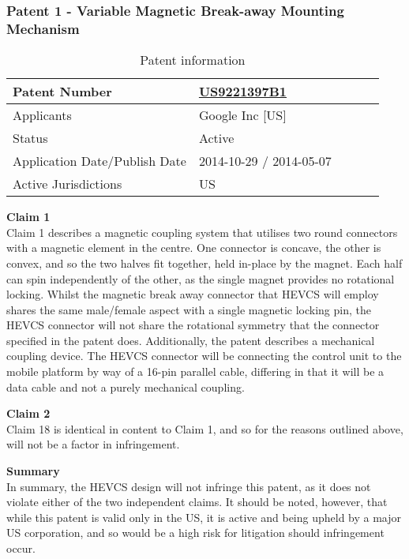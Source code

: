 \documentclass [12pt]{article}
\begin{document}
\subsubsection{Patent 1 - Variable Magnetic Break-away Mounting Mechanism}
\begin{table}[H]
    \centering
    \setlength{\arrayrulewidth}{1.5pt}
    \begin{tabular}{|p{0.5\linewidth}|p{0.5\linewidth}|}
    \hline
    Patent Number & \href{https://worldwide.espacenet.com/patent/search/family/054932262/publication/US9221397B1?q=US9221397B1}{US9221397B1}\\
    \hline
    Applicants & Google Inc [US]\\
    \hline
    Status & Active\\
    \hline
    Application Date/Publish Date & 2014-10-29 / 2014-05-07\\
    \hline
    Active Jurisdictions & US\\
    \hline
    \end{tabular}
    \caption{Patent information}
    \label{table:mag_con1}
\end{table}
\textbf{Claim 1}\\
Claim 1 describes a magnetic coupling system that utilises two round connectors with a magnetic element in the centre. One connector is concave, the other is convex, and so the two halves fit together, held in-place by the magnet. Each half can spin independently of the other, as the single magnet provides no rotational locking.
Whilst the magnetic break away connector that HEVCS will employ shares the same male/female aspect with a single magnetic locking pin, the HEVCS connector will not share the rotational symmetry that the connector specified in the patent does. Additionally, the patent describes a mechanical coupling device. The HEVCS connector will be connecting the control unit to the mobile platform by way of a 16-pin parallel cable, differing in that it will be a data cable and not a purely mechanical coupling.

\textbf{Claim 2}\\
Claim 18 is identical in content to Claim 1, and so for the reasons outlined above, will not be a factor in infringement.

\textbf{Summary}\\
In summary, the HEVCS design will not infringe this patent, as it does not violate either of the two independent claims. It should be noted, however, that while this patent is valid only in the US, it is active and being upheld by a major US corporation, and so would be a high risk for litigation should infringement occur. 
\end{document}
